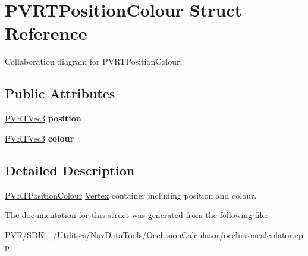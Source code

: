 \hypertarget{struct_p_v_r_t_position_colour}{\section{P\+V\+R\+T\+Position\+Colour Struct Reference}
\label{struct_p_v_r_t_position_colour}
}


Collaboration diagram for P\+V\+R\+T\+Position\+Colour\+:
\subsection*{Public Attributes}
\begin{DoxyCompactItemize}
\item 
\hypertarget{struct_p_v_r_t_position_colour_a7dc46b732d74b9adf4127cd18adf0fc3}{\hyperlink{struct_p_v_r_t_vec3}{P\+V\+R\+T\+Vec3} {\bfseries position}}\label{struct_p_v_r_t_position_colour_a7dc46b732d74b9adf4127cd18adf0fc3}

\item 
\hypertarget{struct_p_v_r_t_position_colour_ac3be36e2c87ddde01332a22bb05d6af7}{\hyperlink{struct_p_v_r_t_vec3}{P\+V\+R\+T\+Vec3} {\bfseries colour}}\label{struct_p_v_r_t_position_colour_ac3be36e2c87ddde01332a22bb05d6af7}

\end{DoxyCompactItemize}


\subsection{Detailed Description}


  \hyperlink{struct_p_v_r_t_position_colour}{P\+V\+R\+T\+Position\+Colour}  \hyperlink{struct_vertex}{Vertex} container including position and colour. 

The documentation for this struct was generated from the following file\+:\begin{DoxyCompactItemize}
\item 
P\+V\+R/\+S\+D\+K\+\_./\+Utilities/\+Nav\+Data\+Tools/\+Occlusion\+Calculator/occlusioncalculator.\+cpp\end{DoxyCompactItemize}

